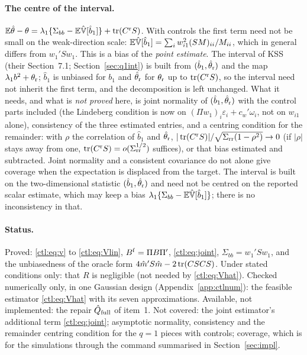 \paragraph{The centre of the interval.} $\mathbb{E}\hat\theta-\theta=\lambda_1\{\Sigma_{bb}-\mathbb{E}\hat{\mathbb{V}}[\hat b_1]\}+\operatorname{tr}(C^{\rm r}S)$.
With controls the first term need not be small on the weak-direction scale:
$\mathbb{E}\hat{\mathbb{V}}[\hat b_1]=\sum_iw_{i1}^2(SM)_{ii}/M_{ii}$, which in general differs from $w_1'Sw_1$. This is a bias of the
\emph{point estimate}. The interval of KSS (their Section~7.1; Section~\ref{sec:q1int}) is built from
$(\hat b_1,\hat\theta_{\rm r})$ and the map $\lambda_1b^2+\theta_{\rm r}$; $\hat b_1$ is unbiased for $b_1$ and
$\hat\theta_{\rm r}$ for $\theta_{\rm r}$ up to $\operatorname{tr}(C^{\rm r}S)$, so the interval need not inherit the first term, and
the decomposition is left unchanged. What it needs, and what is \emph{not proved} here, is joint normality of
$(\hat b_1,\hat\theta_{\rm r})$ with the control parts included (the Lindeberg condition is now on
$(\Pi w_1)_i\varepsilon_i+c_w'\omega_i$, not on $w_{i1}$ alone), consistency of the three estimated entries, and a
centring condition for the remainder: with $\rho$ the correlation of $\hat b_1$ and $\hat\theta_{\rm r}$,
$|\operatorname{tr}(C^{\rm r}S)|/\sqrt{\Sigma_{\rm rr}(1-\rho^2)}\to0$ (if $|\rho|$ stays away from one,
$\operatorname{tr}(C^{\rm r}S)=o(\Sigma_{\rm rr}^{1/2})$ suffices), or that bias estimated and subtracted. Joint normality and a
consistent covariance do not alone give coverage when the expectation is displaced from the target. The interval
is built on the two-dimensional statistic $(\hat b_1,\hat\theta_{\rm r})$ and need not be centred on the reported
scalar estimate, which may keep a bias $\lambda_1\{\Sigma_{bb}-\mathbb{E}\hat{\mathbb{V}}[\hat b_1]\}$; there is no inconsistency in that.

\paragraph{Status.} Proved: \eqref{ctl:eq:v} to \eqref{ctl:eq:Vlin}, $B^{\rm f}=\Pi B\Pi'$, \eqref{ctl:eq:joint},
$\Sigma_{bb}=w_1'Sw_1$, and the unbiasedness of the oracle form $4\hat m'S\hat m-2\operatorname{tr}(CSCS)$. Under stated conditions
only: that $R$ is negligible (not needed by \eqref{ctl:eq:Vhat}). Checked numerically only, in one Gaussian design
(Appendix~\ref{app:ctlnum}): the feasible estimator \eqref{ctl:eq:Vhat} with its seven approximations. Available,
not implemented: the repair $\hat Q_{\rm full}$ of item~1. Not covered: the joint estimator's additional term
\eqref{ctl:eq:joint}; asymptotic normality, consistency and the remainder centring condition for the $q=1$ pieces
with controls; coverage, which is for the simulations through the command summarised in Section~\ref{sec:impl}.

